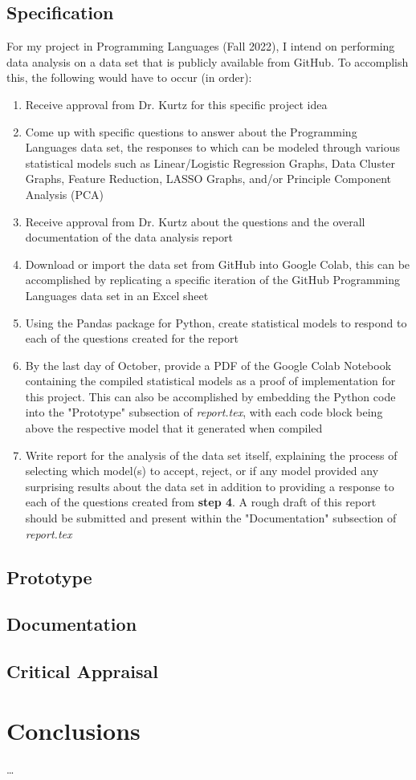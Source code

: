 \documentclass{article}
\theoremstyle{theorem}
\theoremstyle{definition}
\theoremstyle{remark}
\begin{document}
\subsection{Specification}
For my project in Programming Languages (Fall 2022), I intend on performing data analysis on a data set that is publicly available from GitHub. To accomplish this, the following would have to occur (in order):
\begin{enumerate}
    \item Receive approval from Dr. Kurtz for this specific project idea
    \item Come up with specific questions to answer about the Programming Languages data set, the responses to which can be modeled through various statistical models such as Linear/Logistic Regression Graphs, Data Cluster Graphs, Feature Reduction, LASSO Graphs, and/or Principle Component Analysis (PCA)
    \item Receive approval from Dr. Kurtz about the questions and the overall documentation of the data analysis report
    \item Download or import the data set from GitHub into Google Colab, this can be accomplished by replicating a specific iteration of the GitHub Programming Languages data set in an Excel sheet
    \item Using the Pandas package for Python, create statistical models to respond to each of the questions created for the report
    \item By the last day of October, provide a PDF of the Google Colab Notebook containing the compiled statistical models as a proof of implementation for this project. This can also be accomplished by embedding the Python code into the "Prototype" subsection of \textit{report.tex}, with each code block being above the respective model that it generated when compiled
    \item Write report for the analysis of the data set itself, explaining the process of selecting which model(s) to accept, reject, or if any model provided any surprising results about the data set in addition to providing a response to each of the questions created from \textbf{step 4}. A rough draft of this report should be submitted and present within the "Documentation" subsection of \textit{report.tex}
\end{enumerate}
\subsection{Prototype}
\subsection{Documentation}
\subsection{Critical Appraisal}

\section{Conclusions}\label{Conclusions}
\dots
\end{document}
